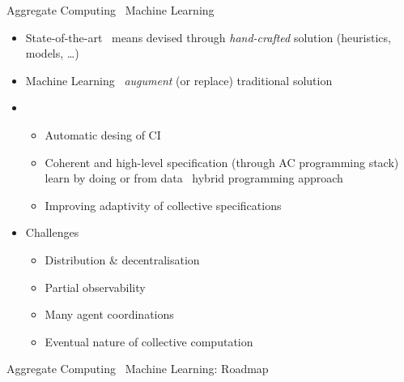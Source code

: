 \documentclass[8pt, aspectratio=169, handout]{beamer}
\begin{document}
\begin{frame}{Aggregate Computing \faPlus \,  Machine Learning}
  \begin{card}
    \begin{itemize}
      \item State-of-the-art \faArrowRight \, means devised through \emph{hand-crafted} solution (heuristics, models, \dots)
      \item Machine Learning \faArrowRight \, \emph{augument} (or replace) traditional solution 
      \item[\success{\faThumbsUp}] 
      \begin{itemize}
        \item Automatic desing of CI
        \item Coherent and high-level specification (through AC programming stack) \faPlus \, learn by doing or from data \faArrowRight \, hybrid programming approach
        \item Improving adaptivity of collective specifications
      \end{itemize}
      \item[\failure{\faThumbsDown}] Challenges
      \begin{itemize}
        \item Distribution \& decentralisation 
        \item Partial observability
        \item Many agent coordinations
        \item Eventual nature of collective computation
      \end{itemize}
    \end{itemize}
  \end{card}
\end{frame}
\begin{frame}{Aggregate Computing \faPlus \,  Machine Learning: Roadmap}
  \centering
\end{frame}
\end{document}
